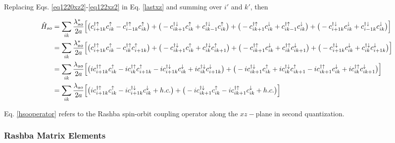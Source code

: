 \documentclass[10pt,prb,showpacs,amssymb,floatfix]{revtex4-1}
\newcommand{\nn}{\nonumber}
\begin{document}
Replacing  Eqs. \eqref{eq1220xz2}-\eqref{eq122xz2} in Eq. \eqref{lastxz} and summing over $i'$ and $k'$, then

\begin{align}
\hat H_{so} &= \sum_{ik} \frac{\lambda_{so}^*}{2a} \Big{[} \big{(}c_{i+1k}^{\dagger \uparrow} c_{ik}^\uparrow - c_{i-1k}^{\dagger \uparrow} c_{ik}^\uparrow\big{)} +  \big{(} - c_{ik+1}^{\dagger \downarrow} c_{ik}^\uparrow + c_{ik-1}^{\dagger \downarrow} c_{ik}^\uparrow  \big{)} +  \big{(} - c_{ik+1}^{\dagger \uparrow} c_{ik}^\downarrow +  c_{ik-1}^{\dagger \uparrow} c_{ik}^\downarrow \big{)} +  \big{(} - c_{i+1k}^{\dagger \downarrow} c_{ik}^\downarrow + c_{i-1k}^{\dagger \downarrow} c_{ik}^\downarrow \big{)}  \Big{]} \nn\\
&= \sum_{ik} \frac{\lambda_{so}^*}{2a} \Big{[} \big{(}c_{i+1k}^{\dagger \uparrow} c_{ik}^\uparrow - c_{ik}^{\dagger \uparrow} c_{i+1k}^\uparrow\big{)} +  \big{(} -c_{ik+1}^{\dagger \downarrow} c_{ik}^\uparrow + c_{ik}^{\dagger \downarrow} c_{ik+1}^\uparrow  \big{)} +  \big{(} -c_{ik+1}^{\dagger \uparrow} c_{ik}^\downarrow +  c_{ik}^{\dagger \uparrow} c_{ik+1}^\downarrow \big{)} +  \big{(} - c_{i+1k}^{\dagger \downarrow} c_{ik}^\downarrow + c_{ik}^{\dagger \downarrow} c_{i+1k}^\downarrow \big{)}  \Big{]} \nn\\
&= \sum_{ik} \frac{\lambda_{so}}{2a} \Big{[} \big{(}i c_{i+1k}^{\dagger \uparrow}  c_{ik}^\uparrow - i c_{ik}^{\dagger \uparrow}  c_{i+1k}^\uparrow  - i c_{i+1k}^{\dagger \downarrow}  c_{ik}^\downarrow + i c_{ik}^{\dagger \downarrow}  c_{i+1k}^\downarrow \big{)} +  \big{(} - i c_{ik+1}^{\dagger \downarrow}  c_{ik}^\uparrow + i c_{ik}^{\dagger \downarrow}  c_{ik+1}^\uparrow   - i c_{ik+1}^{\dagger \uparrow}  c_{ik}^\downarrow +  i c_{ik}^{\dagger \uparrow}  c_{ik+1}^\downarrow \big{)}  \Big{]} \nn\\
&= \sum_{ik} \frac{\lambda_{so}}{2a} \Big{[} \big{(}i c_{i+1k}^{\dagger \uparrow} c_{ik}^\uparrow  - i c_{i+1k}^{\dagger \downarrow} c_{ik}^\downarrow + h.c. \big{)} +  \big{(} -i c_{ik+1}^{\dagger \downarrow}  c_{ik}^\uparrow  - i c_{ik+1}^{\dagger \uparrow}  c_{ik}^\downarrow + h.c. \big{)}  \Big{]}
\label{hsooperator}
\end{align}

Eq. \eqref{hsooperator} refers to the Rashba spin-orbit coupling operator along the $xz-$plane in second quantization.

\subsubsection{Rashba Matrix Elements}
\label{sec:rashbamatrix}
\end{document}
